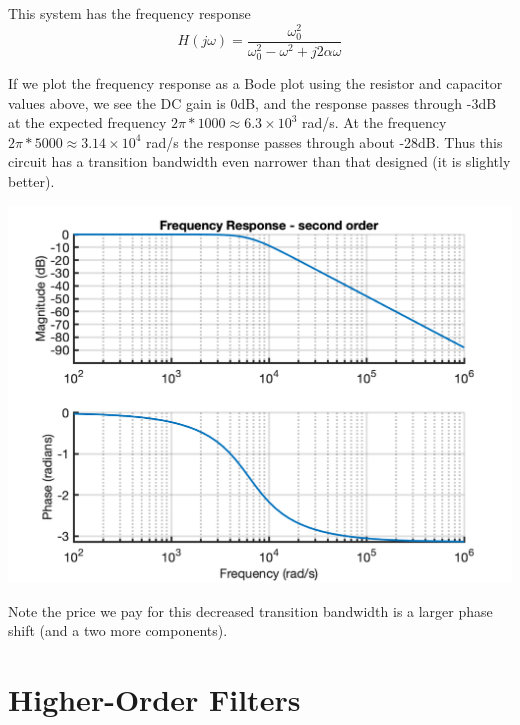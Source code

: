 \begin{example}
\begin{center}
  \end{center}
  
  This system has the frequency response
    \[
  H(j\omega) = \frac{\omega_0^2}{\omega_0^2-\omega^2 + j2\alpha\omega}
  \]

  If we plot the frequency response as a Bode plot using the resistor and capacitor values above, we see the DC gain is 0dB, and the response passes through -3dB at the expected frequency $2\pi*1000 \approx 6.3\times 10^3$ rad/s. At the frequency $2\pi*5000 \approx 3.14\times 10^4$ rad/s the response passes through about -28dB. Thus this circuit has a transition bandwidth even narrower than that designed (it is slightly better). 
  \begin{center}
    \includegraphics[scale=0.7]{graphics/lecture24_2.png}
  \end{center}
  Note the price we pay for this decreased transition bandwidth is a larger phase shift (and a two more components).
\end{example}

\section{Higher-Order Filters}


